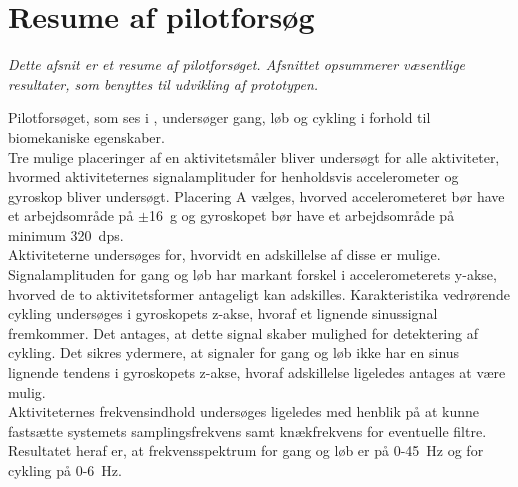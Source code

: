 \section{Resume af pilotforsøg}\label{opsamling_pilot}
\textit{Dette afsnit er et resume af pilotforsøget. Afsnittet opsummerer væsentlige resultater, som benyttes til udvikling af prototypen.%
	}

Pilotforsøget, som ses i , undersøger gang, løb og cykling i forhold til biomekaniske egenskaber. \\
Tre mulige placeringer af en aktivitetsmåler bliver undersøgt for alle aktiviteter, hvormed aktiviteternes signalamplituder for henholdsvis accelerometer og gyroskop bliver undersøgt. Placering A vælges, hvorved accelerometeret bør have et arbejdsområde på $\pm$16~g og gyroskopet bør have et arbejdsområde på minimum 320~dps. \\
Aktiviteterne undersøges for, hvorvidt en adskillelse af disse er mulige. Signalamplituden for gang og løb har markant forskel i accelerometerets y-akse, hvorved de to aktivitetsformer antageligt kan adskilles. Karakteristika vedrørende cykling undersøges i gyroskopets z-akse, hvoraf et lignende sinussignal fremkommer. Det antages, at dette signal skaber mulighed for detektering af cykling. Det sikres ydermere, at signaler for gang og løb ikke har en sinus lignende tendens i gyroskopets z-akse, hvoraf adskillelse ligeledes antages at være mulig. \\
Aktiviteternes frekvensindhold undersøges ligeledes med henblik på at kunne fastsætte systemets samplingsfrekvens samt knækfrekvens for eventuelle filtre. Resultatet heraf er, at frekvensspektrum for gang og løb er på 0-45~Hz og for cykling på 0-6~Hz.

